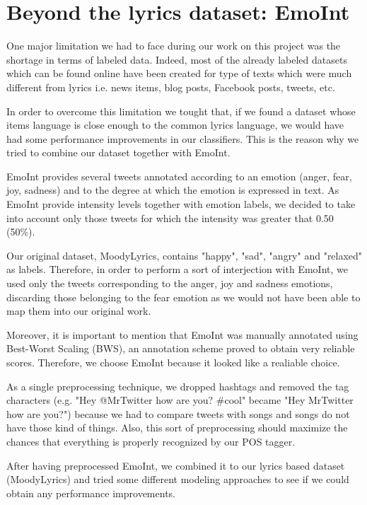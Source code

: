 \section{Beyond the lyrics dataset: EmoInt}

One major limitation we had to face during our work on this project was the shortage in terms of labeled data.
Indeed, most of the already labeled datasets which can be found online have been created for type of texts
which were much different from lyrics i.e. news items, blog posts, Facebook posts, tweets, etc.

In order to overcome this limitation we tought that, if we found a dataset whose items language is close enough
to the common lyrics language, we would have had some performance improvements in our classifiers. This is the
reason why we tried to combine our dataset together with EmoInt\cite{emoint}.

EmoInt provides several tweets annotated according to an emotion (anger, fear, joy, sadness) and to the degree 
at which the emotion is expressed in text. As EmoInt provide intensity levels together with emotion labels, 
we decided to take into account only those tweets for which the intensity was greater that 0.50 (50\%). 

Our original dataset, MoodyLyrics, contains "happy", "sad", "angry" and "relaxed" as labels. 
Therefore, in order to perform a sort of interjection with EmoInt, we used only the tweets corresponding to the anger, 
joy and sadness emotions, discarding those belonging to the fear emotion as we would not have been able to map them into
our original work.

Moreover, it is important to mention that EmoInt was manually annotated using Best-Worst Scaling (BWS)\cite{bws}, 
an annotation scheme proved to obtain very reliable scores. Therefore, we choose EmoInt because it looked
like a realiable choice.

As a single preprocessing technique, we dropped hashtags and removed the tag characters 
(e.g. "Hey @MrTwitter how are you? \#cool" became "Hey MrTwitter how are you?") because 
we had to compare tweets with songs and songs do not have those kind of things. Also, 
this sort of preprocessing should maximize the chances that everything is properly recognized by our POS tagger.

After having preprocessed EmoInt, we combined it to our lyrics based dataset (MoodyLyrics) and tried some different
modeling approaches to see if we could obtain any performance improvements.

